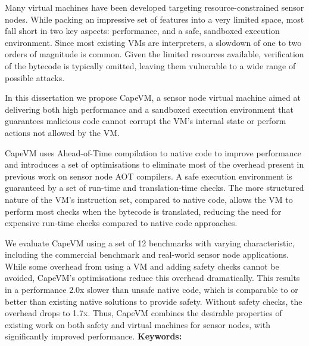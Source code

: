 \begin{abstracten}
Many virtual machines have been developed targeting resource-constrained sensor nodes. While packing an impressive set of features into a very limited space, most fall short in two key aspects: performance, and a safe, sandboxed execution environment. Since most existing VMs are interpreters, a slowdown of one to two orders of magnitude is common. Given the limited resources available, verification of the bytecode is typically omitted, leaving them vulnerable to a wide range of possible attacks.

In this dissertation we propose CapeVM, a sensor node virtual machine aimed at delivering both high performance and a sandboxed execution environment that guarantees malicious code cannot corrupt the VM's internal state or perform actions not allowed by the VM.

CapeVM uses Ahead-of-Time compilation to native code to improve performance and introduces a set of optimisations to eliminate most of the overhead present in previous work on sensor node AOT compilers. A safe execution environment is guaranteed by a set of run-time and translation-time checks. The more structured nature of the VM's instruction set, compared to native code, allows the VM to perform most checks when the bytecode is translated, reducing the need for expensive run-time checks compared to native code approaches.

We evaluate CapeVM using a set of 12 benchmarks with varying characteristic, including the commercial  benchmark and real-world sensor node applications.
While some overhead from using a VM and adding safety checks cannot be avoided, CapeVM's optimisations reduce this overhead dramatically. This results in a performance 2.0x slower than unsafe native code, which is comparable to or better than existing native solutions to provide safety. Without safety checks, the overhead drops to 1.7x. Thus, CapeVM combines the desirable properties of existing work on both safety and virtual machines for sensor nodes, with significantly improved performance.
\bigbreak
\noindent \textbf{Keywords: }{\, \makeatletter \@keywordsen \makeatother}
\end{abstracten}

\begin{comment}


\end{comment}






